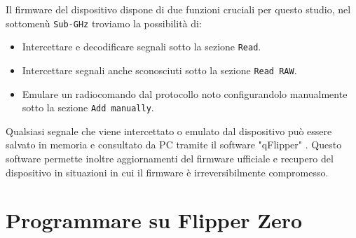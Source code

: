 Il firmware del dispositivo dispone di due funzioni cruciali per questo studio, nel sottomenù \texttt{Sub-GHz} troviamo la possibilità di:
\begin{itemize}
  \item Intercettare e decodificare segnali sotto la sezione \texttt{Read}.
  \item Intercettare segnali anche sconosciuti sotto la sezione \texttt{Read RAW}.
  \item Emulare un radiocomando dal protocollo noto configurandolo manualmente sotto la sezione \texttt{Add manually}.
\end{itemize}
Qualsiasi segnale che viene intercettato o emulato dal dispositivo può essere salvato in memoria e consultato da PC tramite il software "qFlipper" \cite{qflipper}. Questo software permette inoltre aggiornamenti del firmware ufficiale e recupero del dispositivo in situazioni in cui il firmware è irreversibilmente compromesso.

\section{Programmare su Flipper Zero}
\label{sec:flip_prog}

